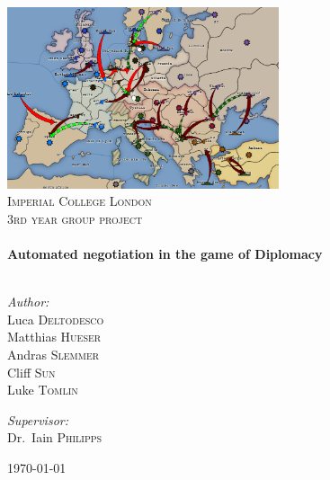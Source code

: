 \begin{titlepage}

\begin{center}

\includegraphics[width=0.60\textwidth]{./screenshots/TitleScreen.png}\\[1cm]    

\textsc{\LARGE Imperial College London}\\[1.5cm]

\textsc{\Large 3rd year group project}\\[0.5cm]

\HRule \\[0.4cm]
{ \huge \bfseries Automated negotiation in the game of Diplomacy}\\[0.4cm]

\HRule \\[1.5cm]

\begin{minipage}{0.4\textwidth}
\begin{flushleft} \large
\emph{Author:}\\
Luca \textsc{Deltodesco} \\
Matthias \textsc{Hueser} \\
Andras \textsc{Slemmer} \\
Cliff \textsc{Sun} \\
Luke \textsc{Tomlin} \\
\end{flushleft}
\end{minipage}
\begin{minipage}{0.4\textwidth}
\begin{flushright} \large
\emph{Supervisor:} \\
Dr.~Iain \textsc{Philipps}
\end{flushright}
\end{minipage}

\vfill

{\large \today}

\end{center}

\end{titlepage}
